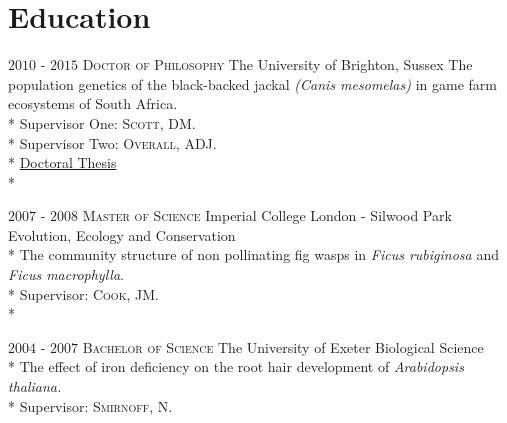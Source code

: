 \documentclass[hidelinks]{james-cv} %
\begin{document}

\section{Education}

\begin{entrylist}

\entry
{$2010$ - $2015$}
{\bodyfontsc\textsc{Doctor of Philosophy}}
{The University of Brighton, Sussex}
{\normalsize\textrm{The population genetics of the black-backed jackal} \textit{(Canis mesomelas)} \normalsize\textrm{in game farm ecosystems of South Africa.}\\*
\normalsize\textrm{Supervisor One:} \normalsize\textsc{Scott, DM.}\\*
\normalsize\textrm{Supervisor Two:} \normalsize\textsc{Overall, ADJ.}\\*
\thinfont\color{blue}\href{https://research.brighton.ac.uk/en/studentTheses/the-population-dynamics-of-the-black-backed-jackal-canis-mesomela}{Doctoral Thesis}}\\*
	
\entry
{$2007$ - $2008$}
{\bodyfontsc\textsc{Master of Science}}
{Imperial College London - Silwood Park}
{\normalsize\textrm{Evolution, Ecology and Conservation}\\* 
\normalsize\textrm {The community structure of non pollinating fig wasps in \textit{Ficus rubiginosa} \textrm{and} \textit {Ficus macrophylla}.} \\*
\normalsize\textrm{Supervisor:} \normalsize\textsc{Cook, JM.}}\\*
	
\entry
{$2004$ - $2007$}
{\bodyfontsc\textsc{Bachelor of Science}}
{The University of Exeter}
{\normalsize\textrm{Biological Science}\\* 
\normalsize\textrm {The effect of iron deficiency on the root hair development of \textit{Arabidopsis thaliana.}} \\*
\normalsize\textrm{Supervisor:} \normalsize\textsc{Smirnoff, N.}}	
\end{entrylist}
\end{document}
